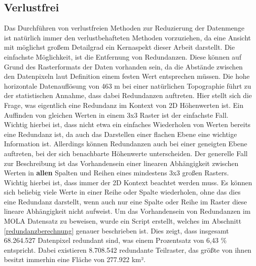 \subsection{Verlustfrei}
Das Durchführen von verlustfreien Methoden zur Reduzierung der Datenmenge ist natürlich immer den verlustbehafteten Methoden vorzuziehen, da eine Ansicht mit möglichst großem Detailgrad ein Kernaspekt dieser Arbeit darstellt. Die einfachste Möglichkeit, ist die Entfernung von Redundanzen. Diese können auf Grund des Rasterformats der Daten vorhanden sein, da die Abstände zwischen den Datenpixeln laut Definition einem festen Wert entsprechen müssen. Die hohe horizontale Datenauflösung von 463 m bei einer natürlichen Topographie führt zu der statistischen Annahme, dass dabei Redundanzen auftreten. Hier stellt sich die Frage, was eigentlich eine Redundanz im Kontext von 2D Höhenwerten ist. Ein Auffinden von gleichen Werten in einem 3x3 Raster ist der einfachste Fall. Wichtig hierbei ist, dass nicht etwa ein einfaches Wiederholen von Werten bereits eine Redundanz ist, da auch das Darstellen einer flachen Ebene eine wichtige Information ist. Allerdings können Redundanzen auch bei einer geneigten Ebene auftreten, bei der sich benachbarte Höhenwerte unterscheiden. Der generelle Fall zur Beschreibung ist das Vorhandensein einer linearen Abhängigkeit zwischen Werten in \textbf{allen} Spalten und Reihen eines mindestens 3x3 großen Rasters\cite{topoDataReduction}. Wichtig hierbei ist, dass immer der 2D Kontext beachtet werden muss. Es können sich beliebig viele Werte in einer Reihe oder Spalte wiederholen, ohne das dies eine Redundanz darstellt, wenn auch nur eine Spalte oder Reihe im Raster diese lineare Abhängigkeit nicht aufweist. Um das Vorhandensein von Redundanzen im MOLA Datensatz zu beweisen, wurde ein Script erstellt, welches im Abschnitt \ref{redundanzberechnung} genauer beschrieben ist. Dies zeigt, dass insgesamt 68.264.527 Datenpixel redundant sind, was einem Prozentsatz von 6,43 \% entspricht. Dabei existieren 8.708.542 redundante Teilraster, das größte von ihnen besitzt immerhin eine Fläche von 277.922 km².

